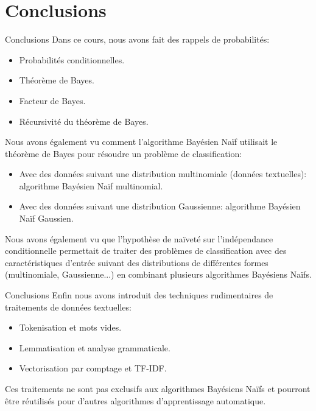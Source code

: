 \section{Conclusions}

\begin{frame}{Conclusions}
	Dans ce cours, nous avons fait des rappels de probabilités:
	\begin{itemize}
		\item Probabilités conditionnelles.
		\item Théorème de Bayes.
		\item Facteur de Bayes.
		\item Récursivité du théorème de Bayes.
	\end{itemize}
	\pause
	Nous avons également vu comment l'algorithme Bayésien Naïf utilisait le théorème de Bayes pour résoudre un problème de classification:
	\begin{itemize}
		\item Avec des données suivant une distribution multinomiale (données textuelles): algorithme Bayésien Naïf multinomial.
		\item Avec des données suivant une distribution Gaussienne: algorithme Bayésien Naïf Gaussien.
	\end{itemize}
	\pause
	Nous avons également vu que l'hypothèse de naïveté sur l'indépendance conditionnelle permettait de traiter des problèmes de classification avec des caractéristiques d'entrée suivant des distributions de différentes formes (multinomiale, Gaussienne...) en combinant plusieurs algorithmes Bayésiens Naïfs.
\end{frame}

\begin{frame}{Conclusions}
	Enfin nous avons introduit des techniques rudimentaires de traitements de données textuelles:
	\begin{itemize}
		\item Tokenisation et mots vides.
		\item Lemmatisation et analyse grammaticale.
		\item Vectorisation par comptage et TF-IDF.
	\end{itemize}
	\pause
	Ces traitements ne sont pas exclusifs aux algorithmes Bayésiens Naïfs et pourront être réutilisés pour d'autres algorithmes d'apprentissage automatique.
\end{frame}

